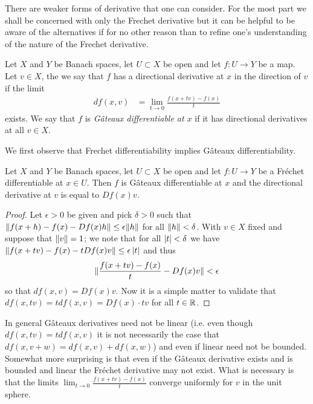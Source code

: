 There are weaker forms of derivative that one can consider.  For the
most part we shall be concerned with only the Frechet derivative but
it can be helpful to be aware of the alternatives if for no other
reason than to refine one's understanding of the nature of the Frechet derivative.
\begin{defn}Let $X$ and $Y$ be Banach spaces, let $U \subset X$ be
  open and let $f : U \to Y$ be
  a map.  Let $v \in X$, the we say that $f$ has a directional
  derivative at $x$ in the direction of $v$ if the limit 
\begin{align*}
df(x,v) &= \lim_{t \to
    0} \frac{f(x + tv) - f(x)}{t}
\end{align*} 
exists.  We say that $f$ is
  \emph{G\^{a}teaux differentiable at $x$} if it has directional
  derivatives at all $v \in X$.
\end{defn}

We first observe that Frechet differentiability implies G\^{a}teaux differentiability.
\begin{prop}\label{FrechetDifferentiableImpliesGateauxDifferentiable}Let $X$ and $Y$ be Banach spaces, let $U \subset X$ be
  open and let $f : U \to Y$ be
  a Fr\'{e}chet differentiable at $x \in U$.  Then $f$ is G\^{a}teaux
  differentiable at $x$ and the directional derivative at $v$ is equal
  to $Df(x)v$.
\end{prop}
\begin{proof}
Let $\epsilon >0$ be given and pick $\delta>0$ such
that $\lVert f(x+h) - f(x) -Df(x)h \rVert \leq \epsilon \lVert h \rVert$ for all
$\lVert h \rVert < \delta$.  With $v \in X$ fixed and suppose that $\lVert v \rVert
= 1$; we note that for all
$\left \vert t \right \vert < \delta$ we have $\lVert f(x+tv) - f(x) - t Df(x) v \rVert
\leq \epsilon \left \vert t \right \vert $ and thus 
\begin{align*}
\lVert \frac{f(x+tv) - f(x) }{t} - Df(x) v \rVert < \epsilon
\end{align*}
so that $df(x,v) = Df(x) v$.  Now it is a simple matter to validate
that $df(x, tv) = t df(x,v) = Df(x) \cdot tv$ for all $t \in \mathbb{R}$.
\end{proof}
In general G\^{a}teaux derivatives need not be linear (i.e. even
though $df(x,tv) = tdf(x,v)$ it is not necessarily the case that
$df(x,v+w) = df(x,v) + df(x,w)$) and even if
linear need not be bounded.  Somewhat more surprising is that even if
the G\^{a}teaux derivative exists and is bounded and linear the
Fr\'{e}chet derivative may not exist.  What is necessary is that the
limits $\lim_{t \to 0} \frac{f(x+tv) -f(x)}{t}$ converge uniformly for
$v$ in the unit sphere.

